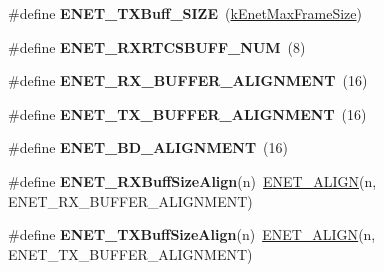 \begin{DoxyCompactItemize}
\item 
\#define {\bfseries E\+N\+E\+T\+\_\+\+T\+X\+Buff\+\_\+\+S\+I\+ZE}~(\hyperlink{group__enet__driver_gga9f232f6ffcec5c632ffbdb26312d2925af383e7bd05019bc27865dd15eed5e213}{k\+Enet\+Max\+Frame\+Size})\hypertarget{group__enet__rtcs__adaptor_gaf6ddf96e0962200f7684ee1273915dc8}{}\label{group__enet__rtcs__adaptor_gaf6ddf96e0962200f7684ee1273915dc8}

\item 
\#define {\bfseries E\+N\+E\+T\+\_\+\+R\+X\+R\+T\+C\+S\+B\+U\+F\+F\+\_\+\+N\+UM}~(8)\hypertarget{group__enet__rtcs__adaptor_gacdaaf16fef6a20a1f640c855484ee73d}{}\label{group__enet__rtcs__adaptor_gacdaaf16fef6a20a1f640c855484ee73d}

\item 
\#define {\bfseries E\+N\+E\+T\+\_\+\+R\+X\+\_\+\+B\+U\+F\+F\+E\+R\+\_\+\+A\+L\+I\+G\+N\+M\+E\+NT}~(16)\hypertarget{group__enet__rtcs__adaptor_ga60dd99f8bcbc7478d41f0c4450f9d78c}{}\label{group__enet__rtcs__adaptor_ga60dd99f8bcbc7478d41f0c4450f9d78c}

\item 
\#define {\bfseries E\+N\+E\+T\+\_\+\+T\+X\+\_\+\+B\+U\+F\+F\+E\+R\+\_\+\+A\+L\+I\+G\+N\+M\+E\+NT}~(16)\hypertarget{group__enet__rtcs__adaptor_ga482a3e2afef362ccb629f3cd5eb596ab}{}\label{group__enet__rtcs__adaptor_ga482a3e2afef362ccb629f3cd5eb596ab}

\item 
\#define {\bfseries E\+N\+E\+T\+\_\+\+B\+D\+\_\+\+A\+L\+I\+G\+N\+M\+E\+NT}~(16)\hypertarget{group__enet__rtcs__adaptor_gaadc5cc757e99b13788f5730077f589c3}{}\label{group__enet__rtcs__adaptor_gaadc5cc757e99b13788f5730077f589c3}

\item 
\#define {\bfseries E\+N\+E\+T\+\_\+\+R\+X\+Buff\+Size\+Align}(n)~\hyperlink{group__enet__driver_ga49324c817c2810ff85f4dfe5490d18eb}{E\+N\+E\+T\+\_\+\+A\+L\+I\+GN}(n, E\+N\+E\+T\+\_\+\+R\+X\+\_\+\+B\+U\+F\+F\+E\+R\+\_\+\+A\+L\+I\+G\+N\+M\+E\+NT)\hypertarget{group__enet__rtcs__adaptor_gae330251bd8e87df1e1d5bbb2c557ee71}{}\label{group__enet__rtcs__adaptor_gae330251bd8e87df1e1d5bbb2c557ee71}

\item 
\#define {\bfseries E\+N\+E\+T\+\_\+\+T\+X\+Buff\+Size\+Align}(n)~\hyperlink{group__enet__driver_ga49324c817c2810ff85f4dfe5490d18eb}{E\+N\+E\+T\+\_\+\+A\+L\+I\+GN}(n, E\+N\+E\+T\+\_\+\+T\+X\+\_\+\+B\+U\+F\+F\+E\+R\+\_\+\+A\+L\+I\+G\+N\+M\+E\+NT)\hypertarget{group__enet__rtcs__adaptor_ga2d1f3a407efe6271bfe0095fbeba334d}{}\label{group__enet__rtcs__adaptor_ga2d1f3a407efe6271bfe0095fbeba334d}


\end{DoxyCompactItemize}
